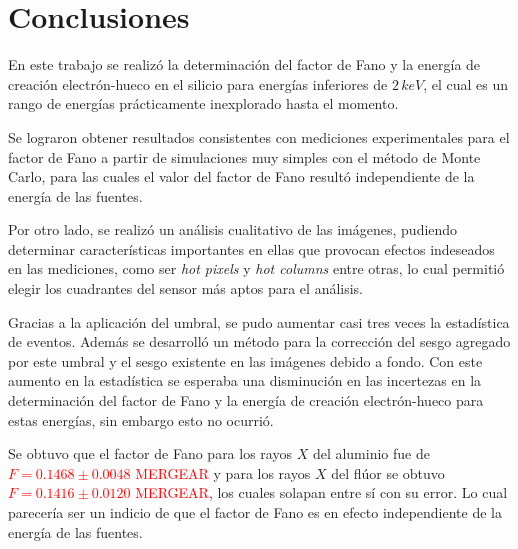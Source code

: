 \chapter{Conclusiones}
\noindent En este trabajo se realizó la determinación del factor de Fano y la energía de creación electrón-hueco en el silicio para energías inferiores de $2\,\si{keV}$, el cual es un rango de energías prácticamente inexplorado hasta el momento.


Se lograron obtener resultados consistentes con mediciones experimentales para el factor de Fano a partir de simulaciones muy simples con el método de Monte Carlo, para las cuales el valor del factor de Fano resultó independiente de la energía de las fuentes.

Por otro lado, se realizó un análisis cualitativo de las imágenes, pudiendo determinar características importantes en ellas que provocan efectos indeseados en las mediciones, como ser \textit{hot pixels} y \textit{hot columns} entre otras, lo cual permitió elegir los cuadrantes del sensor más aptos para el análisis.

Gracias a la aplicación del umbral, se pudo aumentar casi tres veces la estadística de eventos. Además se desarrolló un método para la corrección del sesgo agregado por este umbral y el sesgo existente en las imágenes debido a fondo. Con este aumento en la estadística se esperaba una disminución en las incertezas en la determinación del factor de Fano y la energía de creación electrón-hueco para estas energías, sin embargo esto no ocurrió.

Se obtuvo que el factor de Fano para los rayos $X$ del aluminio fue de \textcolor{red}{$F = 0.1468 \pm 0.0048$ MERGEAR} y para los rayos $X$ del flúor se obtuvo \textcolor{red}{$F = 0.1416 \pm 0.0120$ MERGEAR}, los cuales solapan entre sí con su error. Lo cual parecería ser un indicio de que el factor de Fano es en efecto independiente de la energía de las fuentes.

